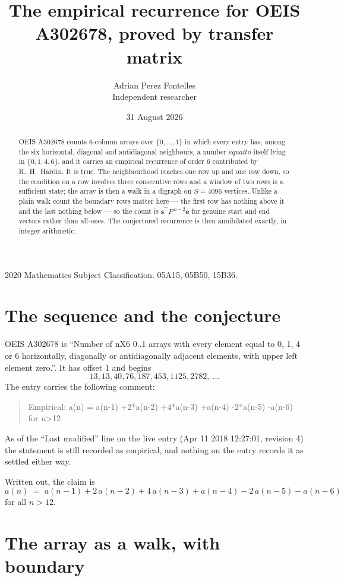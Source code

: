 \documentclass[11pt,a4paper]{article}
\title{The empirical recurrence for OEIS A302678, proved by transfer matrix}
\author{Adrian Perez Fontelles\\ \small Independent researcher}
\date{31 August 2026}
\theoremstyle{plain}
\theoremstyle{definition}
\begin{document}
\maketitle

\begin{abstract}
OEIS A302678 counts $6$-column arrays over $\{0,\dots,1\}$ in which every entry has,
among the six horizontal, diagonal and antidiagonal neighbours, a number $equal to$ itself lying in $\{0,1,4,6\}$, and it carries an empirical
recurrence of order $6$ contributed by R.~H.~Hardin. It is true. The neighbourhood
reaches one row up and one row down, so the condition on a row involves three consecutive
rows and a window of two rows is a sufficient state; the array is then a walk in a digraph
on $S=4096$ vertices. Unlike a plain walk count the boundary rows matter here --- the first
row has nothing above it and the last nothing below --- so the count is
$\mathbf{s}^{\!\top}P^{\,n-2}\mathbf{e}$ for genuine start and end vectors rather than
all-ones. The conjectured recurrence is then annihilated exactly, in integer arithmetic.
\end{abstract}

\noindent\small 2020 Mathematics Subject Classification. 05A15, 05B50, 15B36.\normalsize

\section{The sequence and the conjecture}

OEIS A302678 is ``Number of nX6 0..1 arrays with every element equal to 0, 1, 4 or 6 horizontally, diagonally or antidiagonally adjacent elements, with upper left element zero.''. It has offset
$1$ and begins
\[
13, 13, 40, 76, 187, 453, 1125, 2782,\ \dots
\]
The entry carries the following comment:
\begin{quote}\small
Empirical: a(n) = a(n-1) +2*a(n-2) +4*a(n-3) +a(n-4) -2*a(n-5) -a(n-6) for n>12
\end{quote}
As of the ``Last modified'' line on the live entry (Apr 11 2018 12:27:01, revision
4) the statement is still recorded as empirical, and nothing on the entry
records it as settled either way.

Written out, the claim is
\begin{equation}\label{eq:conj}
a(n)\;=\;a(n-1) + 2\,a(n-2) + 4\,a(n-3) + a(n-4) - 2\,a(n-5) - a(n-6)
\end{equation}
for all $n>12$.

\section{The array as a walk, with boundary}
\end{document}
